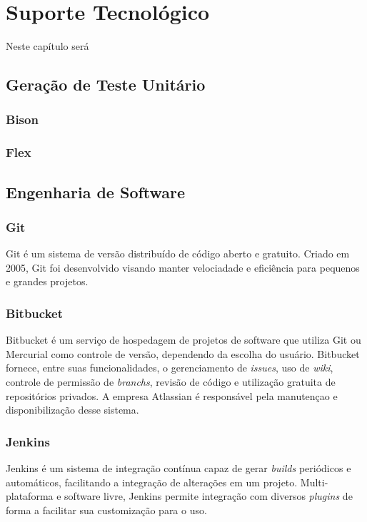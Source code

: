 \chapter[Suporte Tecnologico]{Suporte Tecnológico}

Neste capítulo será 

\section{Geração de Teste Unitário}
\subsection{Bison}
\subsection{Flex}


\section{Engenharia de Software}



\subsection{Git}
Git é um sistema de versão distribuído de código aberto e gratuito. Criado em 2005, Git foi desenvolvido visando manter velociadade e eficiência para pequenos e grandes projetos. 

\subsection{Bitbucket}
Bitbucket é um serviço de hospedagem de projetos de software que utiliza Git ou Mercurial como controle de versão, dependendo da escolha do usuário. Bitbucket fornece, entre suas funcionalidades, o gerenciamento de \textit{issues}, uso de \textit{wiki}, controle de permissão de \textit{branchs}, revisão de código e utilização gratuita de repositórios privados. A empresa Atlassian é responsável pela manutençao e disponibilização desse sistema.

\subsection{Jenkins}
Jenkins é um sistema de integração contínua capaz de gerar \textit{builds} periódicos e automáticos, facilitando a integração de alterações em um projeto. Multi-plataforma e software livre, Jenkins permite integração com diversos \textit{plugins} de forma a facilitar sua customização para o uso.

